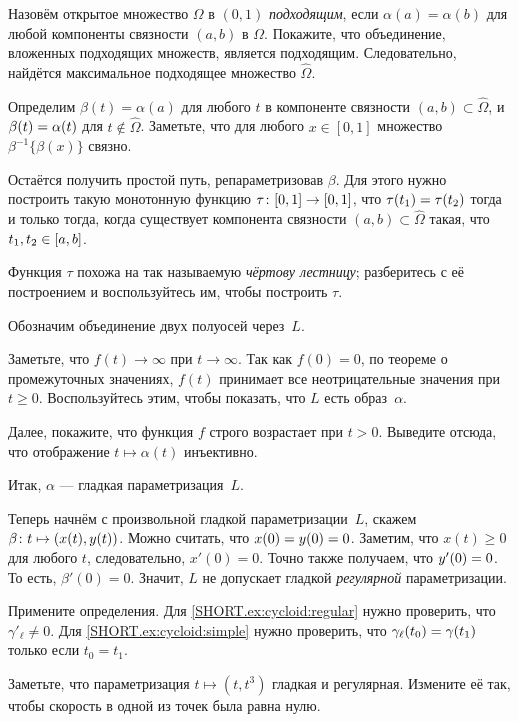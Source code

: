 \begin{multicols}{2}
Назовём открытое множество $\Omega$ в $(0,1)$ {}\emph{подходящим},
если $\alpha(a)=\alpha(b)$ для любой компоненты связности $(a,b)$ в $\Omega$.
Покажите, что объединение, вложенных подходящих множеств, является подходящим.
Следовательно, найдётся максимальное подходящее множество $\hat \Omega$.

Определим $\beta(t)=\alpha(a)$ для любого $t$ в компоненте связности $(a,b)\subset\hat \Omega$, и $\beta (t) \z= \alpha (t) $ для $t\notin\hat{\Omega}$.
Заметьте, что для любого $x\in [0,1]$ множество $\beta^{-1}\{\beta(x)\}$ связно.


Остаётся получить простой путь, репараметризовав $\beta$.
Для этого нужно построить такую монотонную функцию $\tau\:[0,1]\z\to[0,1]$, что 
$\tau(t_1)\z=\tau(t_2)$ тогда и только тогда, когда существует компонента связности $(a,b)\subset\hat \Omega$ такая, что $t_1,t_2\z\in [a,b]$.

Функция $\tau$ похожа на так называемую {}\emph{чёртову лестницу};
разберитесь с её построением и воспользуйтесь им, чтобы построить $\tau$.

Обозначим объединение двух полуосей через~$L$.

Заметьте, что $f(t)\to\infty$ при $t\to \infty$.
Так как $f(0)=0$, по теореме о промежуточных значениях, $f(t)$ принимает все неотрицательные значения при $t\ge 0$.
Воспользуйтесь этим, чтобы показать, что $L$ есть образ~$\alpha$.

Далее, покажите, что функция $f$ строго возрастает при $t> 0$.
Выведите отсюда, что отображение $t\mapsto \alpha(t)$ инъективно.

Итак, $\alpha$ --- гладкая параметризация~$L$.

Теперь начнём с произвольной гладкой параметризации~$L$, скажем $\beta\:t\z\mapsto (x(t),y(t))$.
Можно считать, что $x(0)\z=y(0)=0$.
Заметим, что $x(t)\ge 0$ для любого $t$, следовательно, $x'(0)=0$.
Точно также получаем, что $y'(0)\z=0$.
То есть, $\beta'(0)=0$.
Значит, $L$ не допускает гладкой \textit{регулярной} параметризации.


Примените определения.
Для \ref{SHORT.ex:cycloid:regular} нужно проверить, что $\gamma'_\ell\ne 0$.
Для \ref{SHORT.ex:cycloid:simple} нужно проверить, что $\gamma_\ell(t_0)\z=\gamma(t_1)$ только если $t_0=t_1$.

Заметьте, что параметризация $t\mapsto (t,t^3)$ гладкая и регулярная.
Измените её так, чтобы скорость в одной из точек была равна нулю.


\end{multicols}
